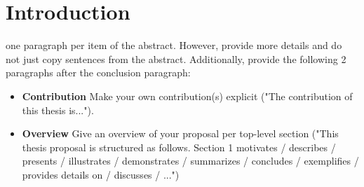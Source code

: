 
\chapter{Introduction}
one paragraph per item of the abstract. However, provide more details and do not just copy sentences from the abstract. Additionally, provide the following 2 paragraphs after the conclusion paragraph:
\begin{itemize}
	\item \textbf{Contribution} Make your own contribution(s) explicit ("The contribution of this thesis is...").
	\item  \textbf{Overview} Give an overview of your proposal per top-level section ("This thesis proposal is structured as follows. Section 1 motivates / describes / presents / illustrates / demonstrates / summarizes / concludes / exemplifies / provides details on / discusses / ...")
\end{itemize}







